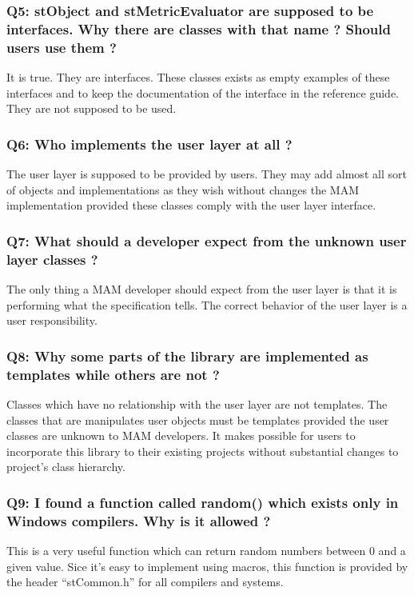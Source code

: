 \subsubsection{Q5: stObject and stMetricEvaluator are supposed to be interfaces. Why there are classes with that name ? Should users use them ?}
It is true. They are interfaces. These classes exists as empty examples of these interfaces and to keep the documentation of the interface in the reference guide. They are not supposed to be used.

\subsubsection{Q6: Who implements the user layer at all ?}
The user layer is supposed to be provided by users. They may add almost all sort of objects and implementations as they wish without changes the MAM implementation provided these classes comply with the user layer interface. 

\subsubsection{Q7: What should a developer expect from the unknown user layer classes ?}
The only thing a MAM developer should expect from the user layer is that it is performing what the specification tells. The correct behavior of the user layer is a user responsibility.

\subsubsection{Q8: Why some parts of the library are implemented as templates while others are not ?}
Classes which have no relationship with the user layer are not templates. The classes that are manipulates user objects must be templates provided the user classes are unknown to MAM developers. It makes possible for users to incorporate this library to their existing projects without substantial changes to project's class hierarchy.

\subsubsection{Q9: I found a function called random() which exists only in Windows compilers. Why is it allowed ?}
This is a very useful function which can return random numbers between 0 and a given value. Sice it's easy to implement using macros, this function is provided by the header ``stCommon.h'' for all compilers and systems.

